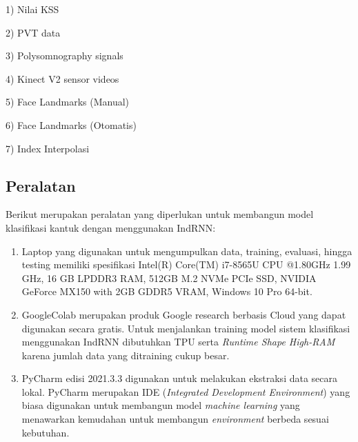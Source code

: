 1)	Nilai KSS

2)	PVT data

3)	Polysomnography signals

4)	Kinect V2 sensor videos

5)	Face Landmarks (Manual)

6)	Face Landmarks (Otomatis)

7)	Index Interpolasi

\subsection{Peralatan}

Berikut merupakan peralatan yang diperlukan untuk membangun model klasifikasi kantuk dengan menggunakan IndRNN:

\begin{enumerate}[nolistsep]
      \item Laptop yang digunakan untuk mengumpulkan data, training, evaluasi, hingga testing memiliki spesifikasi Intel(R)
            Core(TM) i7-8565U CPU @1.80GHz 1.99 GHz, 16 GB LPDDR3 RAM, 512GB M.2 NVMe PCIe SSD, NVIDIA GeForce MX150 with
            2GB GDDR5 VRAM, Windows 10 Pro 64-bit.
      \item GoogleColab merupakan produk Google research berbasis Cloud yang dapat digunakan secara gratis. Untuk menjalankan
            training model sistem klasifikasi menggunakan IndRNN dibutuhkan TPU serta \emph{Runtime Shape High-RAM} karena jumlah
            data yang ditraining cukup besar.
      \item PyCharm edisi 2021.3.3 digunakan untuk melakukan ekstraksi data secara lokal. PyCharm merupakan IDE (\emph{Integrated Development Environment})
            yang biasa digunakan untuk membangun model \emph{machine learning} yang menawarkan kemudahan untuk membangun \emph{environment} berbeda sesuai
            kebutuhan.

\end{enumerate}

